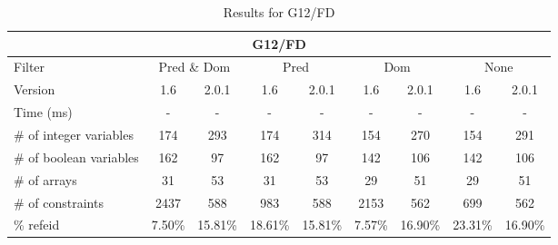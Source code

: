 \documentclass{standalone}
\begin{document}
\begin{table}[H]
\footnotesize
\begin{tabular}{lc|c|c|c|c|c|c|c}
\multicolumn{9}{c}{G12/FD} \\ 
\hline\hline Filter & \multicolumn{2}{c|}{Pred \& Dom} &\multicolumn{2}{c|}{Pred}  & \multicolumn{2}{c|}{Dom} & \multicolumn{2}{c}{None} \\ 
\hline Version & 1.6 & 2.0.1 & 1.6 & 2.0.1 & 1.6 & 2.0.1 & 1.6 & 2.0.1 \\ 
Time (ms)               & - & - & - & - & - & - & - & - \\ 
\# of integer variables & 174 & 293 & 174 & 314 & 154 & 270 & 154 & 291 \\ 
\# of boolean variables & 162 & 97 & 162 & 97 & 142 & 106 & 142 & 106 \\ 
\# of arrays            & 31 & 53 & 31 & 53 & 29 & 51 & 29 & 51 \\ 
\# of constraints       & 2437 & 588 & 983 & 588 & 2153 & 562 & 699 & 562 \\ 
\% refeid               & 7.50\% & 15.81\% & 18.61\% & 15.81\% & 7.57\% & 16.90\% &23.31\% & 16.90\% \\ 
\end{tabular}
\caption{Results for G12/FD}\label{tab:res_g12}
\end{table} 
\end{document}
